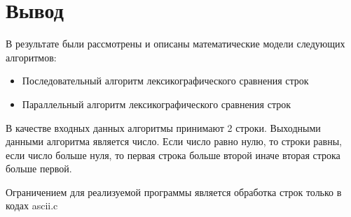     \section*{Вывод}
    
        В результате были рассмотрены и описаны математические модели следующих алгоритмов:
        
        \begin{itemize}
            \item Последовательный алгоритм лексикографического сравнения строк
            \item Параллельный алгоритм лексикографического сравнения строк
        \end{itemize}
        
        В качестве входных данных алгоритмы принимают 2 строки. Выходными данными алгоритма является число. Если число равно нулю, то строки равны, если число больше нуля, то первая строка больше второй иначе вторая строка больше первой.
        
        Ограничением для реализуемой программы является обработка строк только в кодах ascii.c